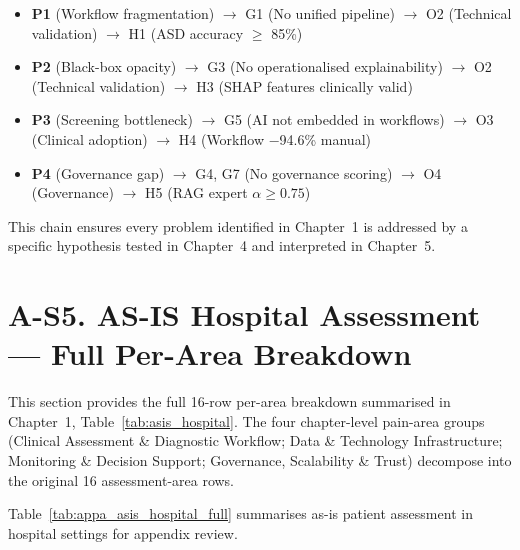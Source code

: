 \begin{itemize}[leftmargin=*, itemsep=3pt]
\item \textbf{P1} (Workflow fragmentation) $\to$ G1 (No unified pipeline) $\to$ O2 (Technical validation) $\to$ H1 (ASD accuracy $\geq$ 85\%)
\item \textbf{P2} (Black-box opacity) $\to$ G3 (No operationalised explainability) $\to$ O2 (Technical validation) $\to$ H3 (SHAP features clinically valid)
\item \textbf{P3} (Screening bottleneck) $\to$ G5 (AI not embedded in workflows) $\to$ O3 (Clinical adoption) $\to$ H4 (Workflow $-$94.6\% manual)
\item \textbf{P4} (Governance gap) $\to$ G4, G7 (No governance scoring) $\to$ O4 (Governance) $\to$ H5 (RAG expert $\alpha \geq 0.75$)
\end{itemize}

\noindent This chain ensures every problem identified in Chapter~1 is addressed by a specific hypothesis tested in Chapter~4 and interpreted in Chapter~5.

\section*{A-S5. AS-IS Hospital Assessment --- Full Per-Area Breakdown}
\label{sec:appa_asis_hospital_full}

\noindent This section provides the full 16-row per-area breakdown summarised in Chapter~1, Table~\ref{tab:asis_hospital}. The four chapter-level pain-area groups (Clinical Assessment \& Diagnostic Workflow; Data \& Technology Infrastructure; Monitoring \& Decision Support; Governance, Scalability \& Trust) decompose into the original 16 assessment-area rows.

\noindent Table~\ref{tab:appa_asis_hospital_full} summarises as-is patient assessment in hospital settings for appendix review.

